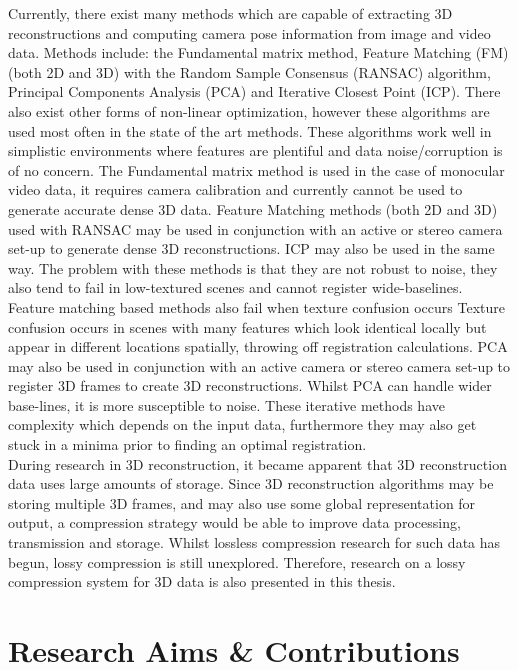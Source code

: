 Currently, there exist many methods which are capable of extracting 3D reconstructions and computing camera pose information from image and video data. Methods include: the Fundamental matrix method, Feature Matching (FM) (both 2D and 3D) with the Random Sample Consensus (RANSAC) algorithm, Principal Components Analysis (PCA) and Iterative Closest Point (ICP). There also exist other forms of non-linear optimization, however these algorithms are used most often in the state of the art methods. These algorithms work well in simplistic environments where features are plentiful and data noise/corruption is of no concern. The Fundamental matrix method is used in the case of monocular video data, it requires camera calibration and currently cannot be used to generate accurate dense 3D data. Feature Matching methods (both 2D and 3D) used with RANSAC may be used in conjunction with an active or stereo camera set-up to generate dense 3D reconstructions. ICP may also be used in the same way. The problem with these methods is that they are not robust to noise, they also tend to fail in low-textured scenes and cannot register wide-baselines. Feature matching based methods also fail when texture confusion occurs Texture confusion occurs in scenes with many features which look identical locally but appear in different locations spatially, throwing off registration calculations. PCA may also be used in conjunction with an active camera or stereo camera set-up to register 3D frames to create 3D reconstructions. Whilst PCA can handle wider base-lines, it is more susceptible to noise. These iterative methods have complexity which depends on the input data, furthermore they may also get stuck in a minima prior to finding an optimal registration. \\


During research in 3D reconstruction, it became apparent that 3D reconstruction data uses large amounts of storage. Since 3D reconstruction algorithms may be storing multiple 3D frames, and may also use some global representation for output, a compression strategy would be able to improve data processing, transmission and storage. Whilst lossless compression research for such data has begun, lossy compression is still unexplored. Therefore, research on a lossy compression system for 3D data is also presented in this thesis. \\


\section{Research Aims \& Contributions}


